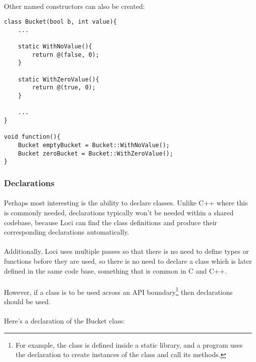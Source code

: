 \documentclass[12pt,twoside,notitlepage]{report}
\begin{document}
\paragraph{}
Other named constructors can also be created:


\begin{lstlisting}
class Bucket(bool b, int value){
	...
	
	static WithNoValue(){
		return @(false, 0);
	}
	
	static WithZeroValue(){
		return @(true, 0);
	}

	...
}

void function(){
	Bucket emptyBucket = Bucket::WithNoValue();
	Bucket zeroBucket = Bucket::WithZeroValue();
}
\end{lstlisting}


\subsubsection{Declarations}

\paragraph{}
Perhaps most interesting is the ability to declare classes. Unlike C++ where this is commonly needed, declarations typically won't be needed within a shared codebase, because Loci can find the class definitions and produce their corresponding declarations automatically.

\paragraph{}
Additionally, Loci uses multiple passes so that there is no need to define types or functions before they are used, so there is no need to declare a class which is later defined in the same code base, something that is common in C and C++.

\paragraph{}
However, if a class is to be used across an API boundary\footnote{For example, the class is defined inside a static library, and a program uses the declaration to create instances of the class and call its methods.} then declarations should be used.

\paragraph{}
Here's a declaration of the Bucket class:
\end{document}
